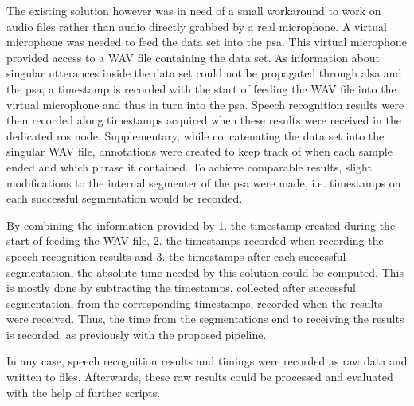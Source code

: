 The existing solution however was in need of a small workaround to work on audio files rather than audio directly grabbed by a real microphone.
A virtual microphone was needed to feed the data set into the \gls{psa}.
This virtual microphone provided access to a WAV file containing the data set. 
As information about singular utterances inside the data set could not be propagated through \gls{alsa} and the \gls{psa}, a timestamp is recorded with the start of feeding the WAV file into the virtual microphone and thus in turn into the \gls{psa}.
Speech recognition results were then recorded along timestamps acquired when these results were received in the dedicated \gls{ros} node.
Supplementary, while concatenating the data set into the singular WAV file, annotations were created to keep track of when each sample ended and which phrase it contained.
To achieve comparable results, slight modifications to the internal segmenter of the \gls{psa} were made, i.e. timestamps on each successful segmentation would be recorded.

By combining the information provided by 1. the timestamp created during the start of feeding the WAV file, 2. the timestamps recorded when recording the speech recognition results and 3. the timestamps after each successful segmentation, the absolute time needed by this solution could be computed. 
This is mostly done by subtracting the timestamps, collected after successful segmentation, from the corresponding timestamps, recorded when the results were received.
Thus, the time from the segmentations end to receiving the results is recorded, as previously with the proposed pipeline.

In any case, speech recognition results and timings were recorded as raw data and written to files.
Afterwards, these raw results could be processed and evaluated with the help of further scripts.

